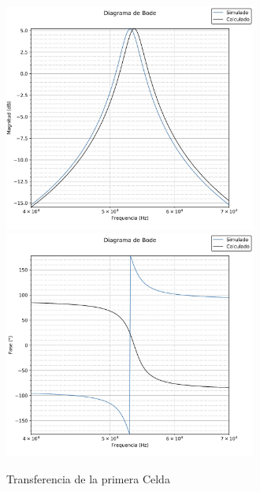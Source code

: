 \begin{figure}[ht]
\begin{center}
\includegraphics[height=7.5cm]{../Ex2/Informe/TransferenciaCell1.jpeg}
\includegraphics[height=7.5cm]{../Ex2/Informe/FaseCell1.jpeg}
\caption{Transferencia de la primera Celda}
\label{fig:e2 H cell1}
\end{center}
\end{figure}

